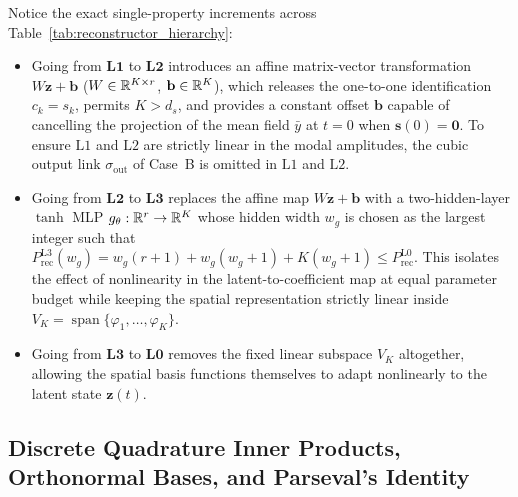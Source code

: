 \noindent Notice the exact single-property increments across Table~\ref{tab:reconstructor_hierarchy}:
\begin{itemize}[leftmargin=2em]
  \item Going from $\mathbf{L1}$ to $\mathbf{L2}$ introduces an affine matrix-vector transformation $W\mathbf{z}+\mathbf{b}$ ($W \in \mathbb{R}^{K \times r}$, $\mathbf{b} \in \mathbb{R}^K$), which releases the one-to-one identification $c_k = s_k$, permits $K > d_s$, and provides a constant offset $\mathbf{b}$ capable of cancelling the projection of the mean field $\bar{y}$ at $t=0$ when $\mathbf{s}(0)=\mathbf{0}$. To ensure $\mathrm{L1}$ and $\mathrm{L2}$ are strictly linear in the modal amplitudes, the cubic output link $\sigma_{\mathrm{out}}$ of Case~B is omitted in $\mathrm{L1}$ and $\mathrm{L2}$.
  \item Going from $\mathbf{L2}$ to $\mathbf{L3}$ replaces the affine map $W\mathbf{z}+\mathbf{b}$ with a two-hidden-layer $\tanh$ MLP $g_\theta : \mathbb{R}^r \to \mathbb{R}^K$ whose hidden width $w_{g}$ is chosen as the largest integer such that $P_{\mathrm{rec}}^{\mathrm{L3}}(w_g) = w_g(r+1) + w_g(w_g+1) + K(w_g+1) \le P_{\mathrm{rec}}^{\mathrm{L0}}$. This isolates the effect of nonlinearity in the latent-to-coefficient map at equal parameter budget while keeping the spatial representation strictly linear inside $V_K = \operatorname{span}\{\varphi_1,\dots,\varphi_K\}$.
  \item Going from $\mathbf{L3}$ to $\mathbf{L0}$ removes the fixed linear subspace $V_K$ altogether, allowing the spatial basis functions themselves to adapt nonlinearly to the latent state $\mathbf{z}(t)$.
\end{itemize}

\subsection{Discrete Quadrature Inner Products, Orthonormal Bases, and Parseval's Identity}
\label{sec:discrete_inner_product}

